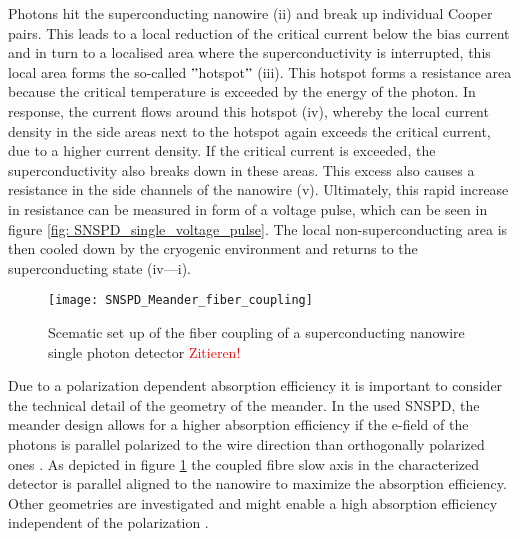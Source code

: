 Photons hit the superconducting nanowire (ii) and break up individual Cooper pairs.
This leads to a local reduction of the critical current below the bias current and in turn to a localised area where
the superconductivity is interrupted, this local area forms the so-called \("\)hotspot\("\) (iii).
This hotspot forms a resistance area because the critical temperature is exceeded by the energy of the photon.
In response, the current flows around this hotspot (iv), whereby the local current density in the side areas next to the
hotspot again exceeds the critical current, due to a higher current density.
If the critical current is exceeded, the superconductivity also breaks down in these areas.
This excess also causes a resistance in the side channels of the nanowire (v).
Ultimately, this rapid increase in resistance can be measured in form of a voltage pulse, which can be seen in figure \ref{fig: SNSPD_single_voltage_pulse}.
The local non-superconducting area is then cooled down by the cryogenic environment and returns to the superconducting state
(iv—i).\\

\begin{figure}[hhh]
    \centering
    \texttt{[image: SNSPD\_Meander\_fiber\_coupling]}
    \caption{Scematic set up of the fiber coupling of a superconducting nanowire single photon detector \textcolor{red}{Zitieren!}}
    \label{fig:SNSPD_fiber_coupling}
\end{figure}


Due to a polarization dependent absorption efficiency it is important to consider the technical detail of the geometry of the meander.
In the used SNSPD, the meander design allows for a higher absorption efficiency if the e-field of the photons
is parallel polarized to the wire direction than orthogonally polarized ones \cite{single-quantum-2022}.
As depicted in figure \ref{fig:SNSPD_fiber_coupling} the coupled fibre slow axis in the characterized
detector is parallel aligned to the nanowire to maximize the absorption efficiency.
Other geometries are investigated and might enable a high absorption efficiency independent of the polarization \cite{zheng-2016}.




